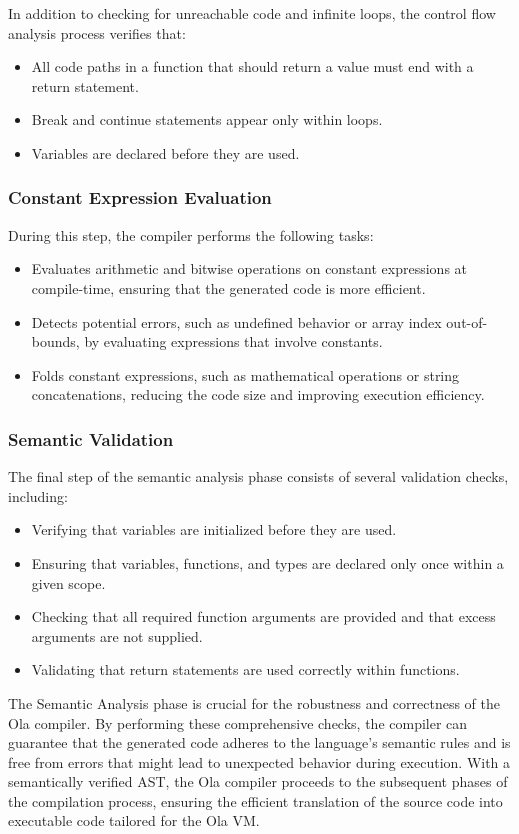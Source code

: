 In addition to checking for unreachable code and infinite loops, the control flow analysis process verifies that:

\begin{itemize}
 \item All code paths in a function that should return a value must end with a return statement.
 \item Break and continue statements appear only within loops.
 \item Variables are declared before they are used.
\end{itemize}

\subsubsection*{Constant Expression Evaluation}

During this step, the compiler performs the following tasks:

\begin{itemize}
  \item Evaluates arithmetic and bitwise operations on constant expressions at compile-time, ensuring that the generated code is more efficient.

  \item Detects potential errors, such as undefined behavior or array index out-of-bounds, by evaluating expressions that involve constants.

  \item Folds constant expressions, such as mathematical operations or string concatenations, reducing the code size and improving execution efficiency.

\end{itemize}

\subsubsection*{Semantic Validation}
 The final step of the semantic analysis phase consists of several validation checks, including:

\begin{itemize}
  \item Verifying that variables are initialized before they are used.
  \item Ensuring that variables, functions, and types are declared only once within a given scope.
  \item Checking that all required function arguments are provided and that excess arguments are not supplied.
  \item Validating that return statements are used correctly within functions.

\end{itemize}

The Semantic Analysis phase is crucial for the robustness and correctness of the Ola compiler. By performing these comprehensive checks, the compiler can guarantee that the generated code adheres to the language's semantic rules and is free from errors that might lead to unexpected behavior during execution. With a semantically verified AST, the Ola compiler proceeds to the subsequent phases of the compilation process, ensuring the efficient translation of the source code into executable code tailored for the Ola VM.